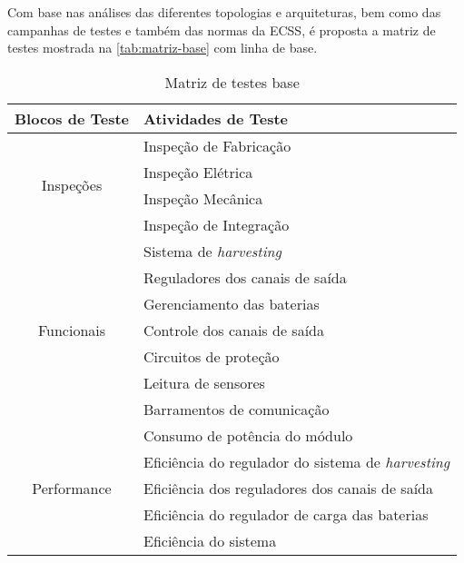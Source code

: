 Com base nas análises das diferentes topologias e arquiteturas, bem como das campanhas de testes e também das normas da \gls{ECSS}, é proposta a matriz de testes mostrada na \autoref{tab:matriz-base} com linha de base.

\begin{table}
    \ABNTEXfontereduzida
    \centering
    \caption{Matriz de testes base}
    \begin{tabular}{cl}
        \toprule
        \textbf{Blocos de Teste} & \textbf{Atividades de Teste} \\
        \midrule
        \midrule
        \multirow{4}{*}{Inspeções}      & Inspeção de Fabricação                \\
                                        & Inspeção Elétrica                     \\
                                        & Inspeção Mecânica                     \\
                                        & Inspeção de Integração                \\
        \midrule
        \multirow{7}{*}{Funcionais}     & Sistema de \textit{harvesting}        \\
                                        & Reguladores dos canais de saída       \\
                                        & Gerenciamento das baterias            \\
                                        & Controle dos canais de saída          \\
                                        & Circuitos de proteção                 \\
                                        & Leitura de sensores                   \\
                                        & Barramentos de comunicação            \\
        \midrule
        \multirow{5}{*}{Performance}    & Consumo de potência do módulo         \\
                                        & Eficiência do regulador do sistema de \textit{harvesting} \\
                                        & Eficiência dos reguladores dos canais de saída \\
                                        & Eficiência do regulador de carga das baterias \\
                                        & Eficiência do sistema                 \\

\end{tabular}
\end{table}
